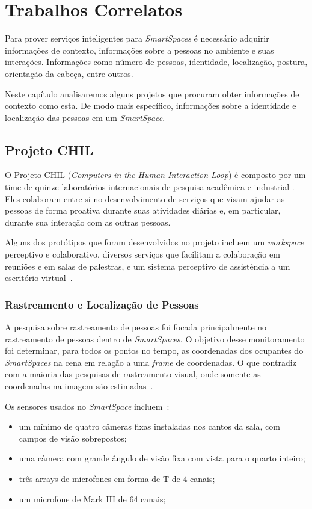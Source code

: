 \chapter{Trabalhos Correlatos}

Para prover serviços inteligentes para \textit{SmartSpaces} é necessário adquirir informações de contexto, informações sobre a pessoas no ambiente e suas interações. Informações como número de pessoas, identidade, localização, postura, orientação da cabeça, entre outros.

Neste capítulo analisaremos alguns projetos que procuram obter informações de contexto como esta. De modo mais específico, informações sobre a identidade e localização das pessoas em um \textit{SmartSpace}.

\section{Projeto CHIL}

O Projeto CHIL (\textit{Computers in the Human Interaction Loop}) é composto por um time de quinze laboratórios internacionais de pesquisa acadêmica e industrial . Eles colaboram entre si no desenvolvimento de serviços que visam ajudar as pessoas de forma proativa durante suas atividades diárias e, em particular, durante sua interação com as outras pessoas. 

Alguns dos protótipos que foram desenvolvidos no projeto incluem um \textit{workspace} perceptivo e colaborativo, diversos serviços que facilitam a colaboração em reuniões e em salas de palestras, e um sistema perceptivo de assistência a um escritório virtual~\cite{chil}.

\subsection{Rastreamento e Localização de Pessoas}

A pesquisa sobre rastreamento de pessoas foi focada principalmente no rastreamento de pessoas dentro de \textit{SmartSpaces}. O objetivo desse monitoramento foi determinar, para todos os pontos no tempo, as coordenadas dos ocupantes do \textit{SmartSpaces} na cena em relação a uma \textit{frame} de coordenadas. O que contradiz com a maioria das pesquisas de rastreamento visual, onde somente as coordenadas na imagem  são estimadas~\cite{chil}.

Os sensores usados no \textit{SmartSpace} incluem~\cite{chil}:
	
	\begin{itemize}
		\item um mínimo de quatro câmeras fixas instaladas nos cantos da sala, com campos de visão sobrepostos;
		\item uma câmera com grande ângulo de visão fixa com vista para o quarto inteiro;
		\item três arrays de microfones em forma de T de 4 canais;
		\item um microfone de Mark III de 64 canais;
	\end{itemize}

